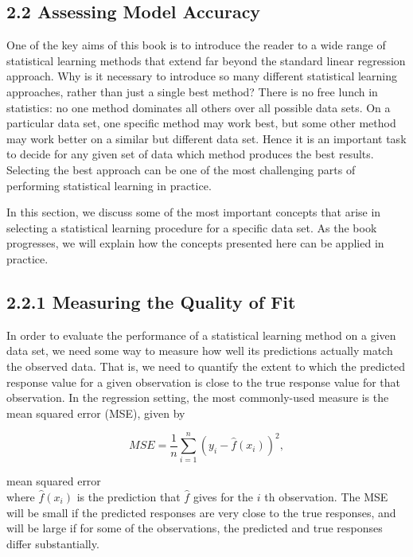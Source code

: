 \documentclass[10pt]{article}
\begin{document}
\subsection*{2.2 Assessing Model Accuracy}
One of the key aims of this book is to introduce the reader to a wide range of statistical learning methods that extend far beyond the standard linear regression approach. Why is it necessary to introduce so many different statistical learning approaches, rather than just a single best method? There is no free lunch in statistics: no one method dominates all others over all possible data sets. On a particular data set, one specific method may work best, but some other method may work better on a similar but different data set. Hence it is an important task to decide for any given set of data which method produces the best results. Selecting the best approach can be one of the most challenging parts of performing statistical learning in practice.

In this section, we discuss some of the most important concepts that arise in selecting a statistical learning procedure for a specific data set. As the book progresses, we will explain how the concepts presented here can be applied in practice.

\subsection*{2.2.1 Measuring the Quality of Fit}
In order to evaluate the performance of a statistical learning method on a given data set, we need some way to measure how well its predictions actually match the observed data. That is, we need to quantify the extent to which the predicted response value for a given observation is close to the true response value for that observation. In the regression setting, the most commonly-used measure is the mean squared error (MSE), given by


\begin{equation*}
M S E=\frac{1}{n} \sum_{i=1}^{n}\left(y_{i}-\hat{f}\left(x_{i}\right)\right)^{2}, \tag{2.5}
\end{equation*}


mean squared error\\
where $\hat{f}\left(x_{i}\right)$ is the prediction that $\hat{f}$ gives for the $i$ th observation. The MSE will be small if the predicted responses are very close to the true responses, and will be large if for some of the observations, the predicted and true responses differ substantially.
\end{document}

